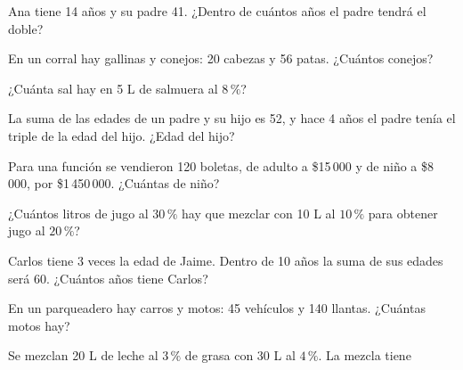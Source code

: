 \taller
{}
\begin{ejercicios}
\item Ana tiene 14 años y su padre 41. ¿Dentro de cuántos años el padre tendrá el doble? 
\item En un corral hay gallinas y conejos: 20 cabezas y 56 patas. ¿Cuántos conejos? 
\item ¿Cuánta sal hay en 5 L de salmuera al $8\,\%$? 
\end{ejercicios}
\begin{ejercicios}
\item La suma de las edades de un padre y su hijo es 52, y hace 4 años el padre tenía el triple de la edad del hijo. ¿Edad del hijo? 
\item Para una función se vendieron 120 boletas, de adulto a \$15\,000 y de niño a \$8\,000, por \$1\,450\,000. ¿Cuántas de niño? 
\item ¿Cuántos litros de jugo al $30\,\%$ hay que mezclar con 10 L al $10\,\%$ para obtener jugo al $20\,\%$? 
\end{ejercicios}
\begin{ejercicios}
\item Carlos tiene 3 veces la edad de Jaime. Dentro de 10 años la suma de sus edades será 60. ¿Cuántos años tiene Carlos?
\item En un parqueadero hay carros y motos: 45 vehículos y 140 llantas. ¿Cuántas motos hay?
\item Se mezclan 20 L de leche al $3\,\%$ de grasa con 30 L al $4\,\%$. La mezcla tiene
\end{ejercicios}

\bitacora


